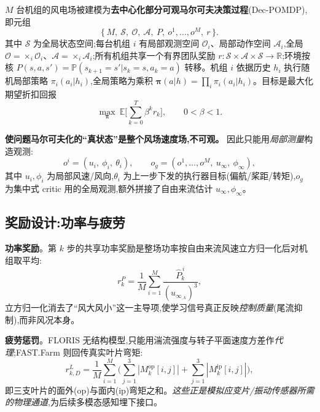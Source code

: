 \documentclass[12pt,a4paper]{article}
\theoremstyle{definition}
\theoremstyle{plain}
\newcommand{\R}{\mathbb{R}}
\newcommand{\E}{\mathbb{E}}
\newcommand{\Prob}{\mathbb{P}}
\newcommand{\calS}{\mathcal{S}}
\newcommand{\calA}{\mathcal{A}}
\newcommand{\calO}{\mathcal{O}}
\newcommand{\bpi}{\bm{\pi}}
\newcommand{\wind}{u_{\infty}}
\newcommand{\dir}{\phi_{\infty}}
\begin{document}
$M$ 台机组的风电场被建模为\textbf{去中心化部分可观马尔可夫决策过程}(Dec-POMDP),即元组
\begin{equation}
  \big\{\,M,\ \calS,\ \calO,\ \calA,\ P,\ o^1,\dots,o^M,\ r\,\big\}.
\end{equation}
其中 $\calS$ 为全局状态空间;每台机组 $i$ 有局部观测空间 $\calO_i$、局部动作空间 $\calA_i$,全局 $\calO=\times_i\calO_i$、$\calA=\times_i\calA_i$;所有机组共享一个有界团队奖励 $r:\calS\times\calA\times\calS\to\R$;环境按核 $P(s,a,s')=\Prob(s_{k+1}=s'|s_k=s,a_k=a)$ 转移。机组 $i$ 依据历史 $h_i$ 执行随机局部策略 $\pi_i(a_i|h_i)$,全局策略为乘积 $\bpi(a|h)=\prod_i\pi_i(a_i|h_i)$。目标是最大化期望折扣回报
\begin{equation}
  \max_{\bpi}\ \E\Big[\sum_{k=0}^{T}\beta^k r_k\Big],\qquad 0<\beta<1.
  \label{eq:obj}
\end{equation}

\textbf{使问题马尔可夫化的“真状态”是整个风场速度场,不可观。} 因此只能用\emph{局部测量}构造观测:
\begin{equation}
  o^i=(u_i,\ \phi_i,\ \theta_i),\qquad o_g=(o^1,\dots,o^M,\ \wind,\ \dir),
\end{equation}
其中 $u_i,\phi_i$ 为局部风速/风向,$\theta_i$ 为上一步下发的执行器目标(偏航/桨距/转矩),$o_g$ 为集中式 critic 用的全局观测,额外拼接了自由来流估计 $\wind,\dir$。

\subsection{奖励设计:功率与疲劳}
\label{sec:reward}

\textbf{功率奖励}。第 $k$ 步的共享功率奖励是整场功率按自由来流风速立方归一化后对机组取平均:
\begin{equation}
  r^{P}_{k}=\frac{1}{M}\sum_{i=1}^{M}\frac{\hat P^{\,i}_{k}}{(\wind_{,k})^{3}},
  \label{eq:rp}
\end{equation}
立方归一化消去了“风大风小”这一主导项,使学习信号真正反映\emph{控制质量}(尾流抑制),而非风况本身。

\textbf{疲劳惩罚}。FLORIS 无结构模型,只能用湍流强度与转子平面速度方差作\emph{代理};FAST.Farm 则回传真实叶片弯矩:
\begin{equation}
  r^{L}_{k,D}=\frac{1}{M}\sum_{i=1}^{M}\Big(\sum_{j=1}^{3}|M^{\text{op}}_k[i,j]|+\sum_{j=1}^{3}|M^{\text{ip}}_k[i,j]|\Big),
\end{equation}
即三支叶片的面外($\text{op}$)与面内($\text{ip}$)弯矩之和。\emph{这些正是模拟应变片/振动传感器所需的物理通道},为后续多模态感知埋下接口。
\end{document}
